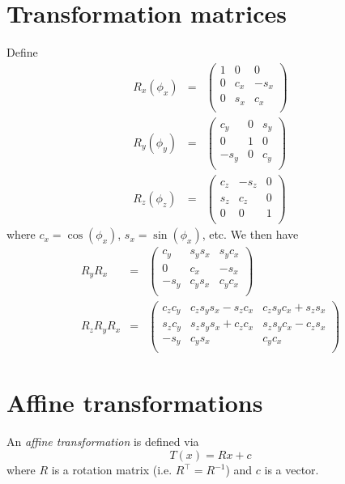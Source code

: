 \documentclass[a4paper]{article}
\begin{document}
\section{Transformation matrices}
Define
\begin{eqnarray}
R_x(\phi_x) &=& \left(\begin{array}{ccc}
1 & 0 & 0\\
0 & c_x & -s_x\\
0 & s_x &  c_x\\
\end{array}\right)\\
R_y(\phi_y) &=& \left(\begin{array}{ccc}
c_y & 0 & s_y\\
0 & 1 & 0\\
-s_y & 0 & c_y\\
\end{array}\right)\\
R_z(\phi_z) &=& \left(\begin{array}{ccc}
c_z & -s_z & 0\\
s_z & c_z & 0\\
0 & 0 & 1\\
\end{array}\right)
\end{eqnarray}
where $c_x = \cos(\phi_x)$, $s_x = \sin(\phi_x)$, etc. We then have
\begin{eqnarray}
R_y R_x &=& \left( \begin{array}{ccc}
c_y  & s_y s_x & s_y c_x\\
0    & c_x     & -s_x\\
-s_y & c_y s_x & c_y c_x\\
\end{array}\right)\\
R_z R_y R_x &=& \left( \begin{array}{ccc}
c_z c_y & c_z s_y s_x - s_z c_x & c_z s_y c_x + s_z s_x\\
s_z c_y & s_z s_y s_x + c_z c_x & s_z s_y c_x - c_z s_x\\
-s_y    & c_y s_x               & c_y c_x              \\
\end{array}\right)
\end{eqnarray}

\section{Affine transformations}
An \textit{affine transformation} is defined via
\begin{equation}
T(x) = R x + c
\end{equation}
where $R$ is a rotation matrix (i.e. $R^\top = R^{-1}$) and $c$ is a vector.
\end{document}
